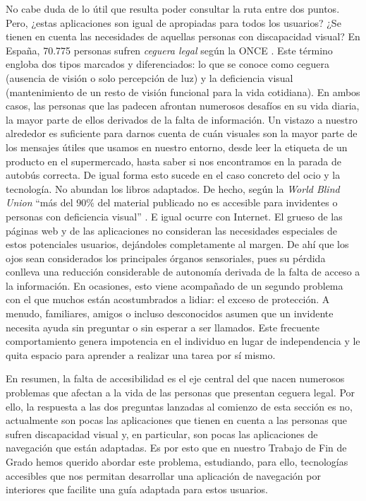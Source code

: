 No cabe duda de lo útil que resulta poder consultar la ruta entre dos puntos. Pero, ¿estas aplicaciones son igual de apropiadas para todos los usuarios? ¿Se tienen en cuenta las necesidades de aquellas personas con discapacidad visual? En España, 70.775 personas sufren \textit{ceguera legal} según la ONCE \citep{informeceguera}. Este término engloba dos tipos marcados y diferenciados: lo que se conoce como ceguera (ausencia de visión o solo percepción de luz) y la deficiencia visual (mantenimiento de un resto de visión funcional para la vida cotidiana). En ambos casos, las personas que las padecen afrontan numerosos desafíos en su vida diaria, la mayor parte de ellos derivados de la falta de información. Un vistazo a nuestro alrededor es suficiente para darnos cuenta de cuán visuales son la mayor parte de los mensajes útiles que usamos en nuestro entorno, desde leer la etiqueta de un producto en el supermercado, hasta saber si nos encontramos en la parada de autobús correcta. De igual forma esto sucede en el caso concreto del ocio y la tecnología. No abundan los libros adaptados. De hecho, según la \textit{World Blind Union} ``más del $90\%$ del material publicado no es accesible para invidentes o personas con deficiencia visual'' \citep{envision}. E igual ocurre con Internet. El grueso de las páginas web y de las aplicaciones no consideran las necesidades especiales de estos potenciales usuarios, dejándoles completamente al margen. De ahí que los ojos sean considerados los principales órganos sensoriales, pues su pérdida conlleva una reducción considerable de autonomía derivada de la falta de acceso a la información. En ocasiones, esto viene acompañado de un segundo problema con el que muchos están acostumbrados a lidiar: el exceso de protección. A menudo, familiares, amigos o incluso desconocidos asumen que un invidente necesita ayuda sin preguntar o sin esperar a ser llamados. Este frecuente comportamiento genera impotencia en el individuo en lugar de independencia y le quita espacio para aprender a realizar una tarea por sí mismo. 

En resumen, la falta de accesibilidad es el eje central del que nacen numerosos problemas que afectan a la vida de las personas que presentan ceguera legal. Por ello, la respuesta a las dos preguntas lanzadas al comienzo de esta sección es no, actualmente son pocas las aplicaciones que tienen en cuenta a las personas que sufren discapacidad visual y, en particular, son pocas las aplicaciones de navegación que están adaptadas. Es por esto que en nuestro Trabajo de Fin de Grado hemos querido abordar este problema, estudiando, para ello, tecnologías accesibles que nos permitan desarrollar una aplicación de navegación por interiores que facilite una guía adaptada para estos usuarios.

